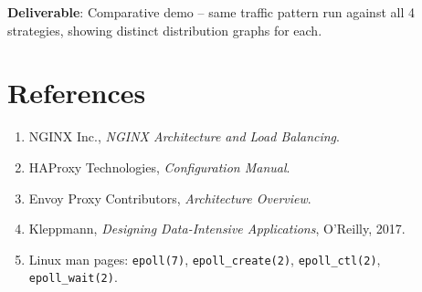 \documentclass[11pt, a4paper]{article}
\begin{document}
\textbf{Deliverable}: Comparative demo -- same traffic pattern run against all 4 strategies, showing distinct distribution graphs for each.

\section{References}
\begin{enumerate}
    \item NGINX Inc., \textit{NGINX Architecture and Load Balancing}.
    \item HAProxy Technologies, \textit{Configuration Manual}.
    \item Envoy Proxy Contributors, \textit{Architecture Overview}.
    \item Kleppmann, \textit{Designing Data-Intensive Applications}, O'Reilly, 2017.
    \item Linux man pages: \texttt{epoll(7)}, \texttt{epoll\_create(2)}, \texttt{epoll\_ctl(2)}, \texttt{epoll\_wait(2)}.
\end{enumerate}
\end{document}

